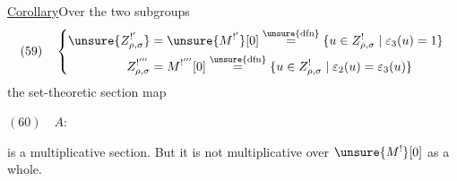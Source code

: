 \uline{Corollary}\quad Over the two subgroups
\[
(59)\quad\left\{\begin{aligned}
\unsure{Z_{\rho,\sigma}^{!'}}&=\unsure{M^{!'}}[0]
\overset{\unsure{\mathrm{dfn}}}{=}
\{u\in Z_{\rho,\sigma}^{!}\mid\varepsilon_3(u)=1\}\\
Z_{\rho,\sigma}^{!'''}&=M^{!'''}[0]
\overset{\unsure{\mathrm{dfn}}}{=}
\{u\in Z_{\rho,\sigma}^{!}\mid\varepsilon_2(u)=\varepsilon_3(u)\}
\end{aligned}\right.
\]
the set-theoretic section map

$(60)\quad A:$

is a multiplicative section. But it is not multiplicative
over $\unsure{M^{!}}[0]$ as a whole.

